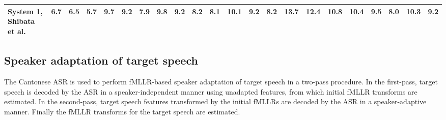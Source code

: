 \documentclass[a4paper]{article}
\begin{document}
\begin{table}[htbp]
{\begin{tabular}{lccc|ccc|ccc|c||ccc|ccc|ccc|c||c}
System 1, Shibata et al.  \cite{shibata2017composite} & 6.7 & 6.5 & 5.7 & 9.7 & 9.2 & 7.9 & 9.8 & 9.2 & 8.2 & 8.1 & 10.1 & 9.2 & 8.2 & 13.7 & 12.4 & 10.8 & 10.4 & 9.5 & 8.0 & 10.3 & 9.2 \\ 
\bottomrule
\end{tabular}%
}
\label{tab:abx_results}
\end{table}
\subsection{Speaker adaptation of target speech}
The Cantonese ASR is used to perform fMLLR-based speaker adaptation of target speech in a two-pass procedure. 
In the first-pass, target speech is decoded by the ASR in a speaker-independent manner using unadapted features, from which initial fMLLR transforms are estimated. 
In the second-pass, target speech features transformed by the initial fMLLRs are decoded by the ASR in a speaker-adaptive manner. Finally the fMLLR transforms for the target speech are estimated.
\end{document}
